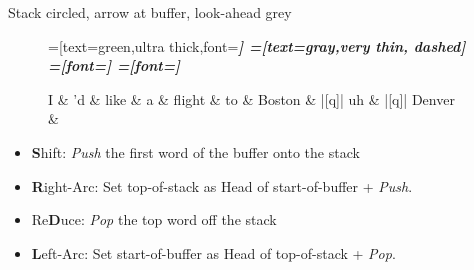 \documentclass{lecture}
\begin{document}
\begin{plain}{Stack circled, arrow at buffer, look-ahead grey}
\begin{figure}
    \centering
    \begin{dependency}[theme=simple]
    =[text=green,ultra thick,font=\bfseries\itshape]
    =[text=gray,very thin, dashed]
    =[font=\bfseries\itshape]
    =[font=\itshape]
    \begin{deptext}[column sep=.075cm, row sep=.1ex]
        I \& 'd \& like \& a \& flight \& to \& Boston \& |[q]| uh \& |[q]| Denver \\
         \& \\
    \end{deptext}
\end{dependency}
\end{figure}
    \begin{itemize}
        \item \textbf{S}hift: \emph{Push} the first word of the buffer onto the stack
    \item \textbf{R}ight-Arc: Set top-of-stack as Head of start-of-buffer + \emph{Push}.
    \item Re\textbf{D}uce: \emph{Pop} the top word off the stack
    \item \textbf{L}eft-Arc: Set start-of-buffer as Head of top-of-stack + \emph{Pop}.
    \end{itemize}
\end{plain}
\end{document}
